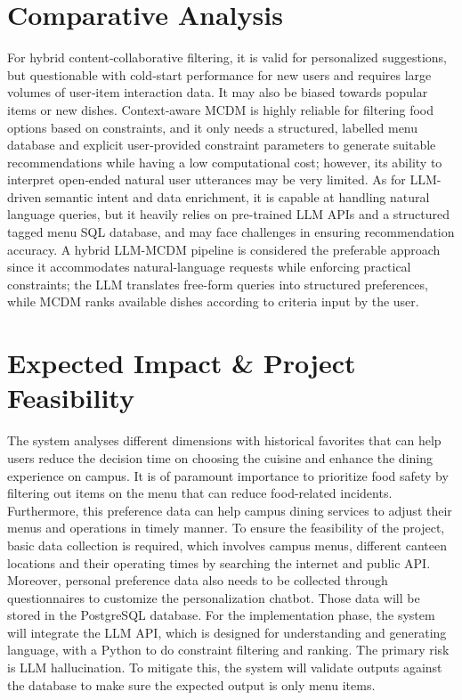 \documentclass{article}
\begin{document}
\section{Comparative Analysis}
For hybrid content‑collaborative filtering, it is valid for personalized suggestions, but questionable with cold‑start performance for new users and requires large volumes of user‑item interaction data. It may also be biased towards popular items or new dishes.
Context‑aware MCDM is highly reliable for filtering food options based on constraints, and it only needs a structured, labelled menu database and explicit user‑provided constraint parameters to generate suitable recommendations while having a low computational cost; however, its ability to interpret open‑ended natural user utterances may be very limited.
As for LLM-driven semantic intent and data enrichment, it is capable at handling natural language queries, but it heavily relies on pre-trained LLM APIs and a structured tagged menu SQL database, and may face challenges in ensuring recommendation accuracy.
A hybrid LLM-MCDM pipeline is considered the preferable approach since it accommodates natural-language requests while enforcing practical constraints; the LLM translates free-form queries into structured preferences, while MCDM ranks available dishes according to criteria input by the user.
\section{Expected Impact \& Project Feasibility}
The system analyses different dimensions with historical favorites that can help users reduce the decision time on choosing the cuisine and enhance the dining experience on campus. It is of paramount importance to prioritize food safety by filtering out items on the menu that can reduce food-related incidents. Furthermore, this preference data can help campus dining services to adjust their menus and operations in timely manner.
To ensure the feasibility of the project, basic data collection is required, which involves campus menus, different canteen locations and their operating times by searching the internet and public API. Moreover, personal preference data also needs to be collected through questionnaires to customize the personalization chatbot. Those data will be stored in the PostgreSQL database. For the implementation phase, the system will integrate the LLM API, which is designed for understanding and generating language, with a Python to do constraint filtering and ranking. The primary risk is LLM hallucination. To mitigate this, the system will validate outputs against the database to make sure the expected output is only menu items.
\end{document}
